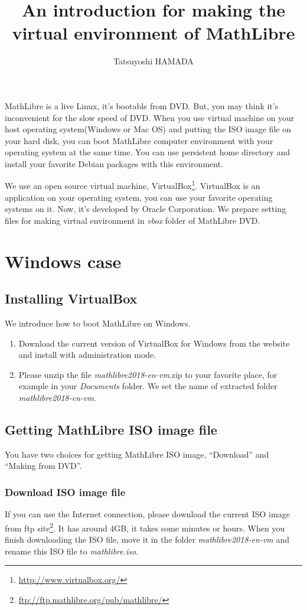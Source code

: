 \documentclass[a4]{article}
\title{An introduction for making the virtual environment of MathLibre}
\author{Tatsuyoshi HAMADA}
\newcommand{\vm}{{\em mathlibre2018-en-vm}}
\begin{document}
\maketitle
MathLibre is a live Linux, it's bootable from DVD.
But, you may think it's inconvenient for the slow speed of DVD.
When you use virtual machine on your host operating system(Windows or Mac OS) and
putting the ISO image file on your hard disk,
you can boot MathLibre computer environment with your operating system
at the same time.
You can use persistent home directory and install your favorite Debian
packages with this environment.

We use an open source virtual machine,
VirtualBox\footnote{\url{http://www.virtualbox.org/}}.
VirtualBox is an application on your operating system,
you can use your favorite operating systems on it.
Now, it's developed by Oracle Corporation.
We prepare setting files for making virtual environment 
in {\em vbox} folder of MathLibre DVD.

\section{Windows case}
\subsection{Installing VirtualBox}
We introduce how to boot MathLibre on Windows.
\begin{enumerate}
 \item Download the current version of VirtualBox for Windows from the
       website and install with administration mode.
 \item Please unzip the file \vm.zip{} to your favorite place, for example
       in your {\em Documents} folder. We set the name of extracted folder \vm{}.
\end{enumerate}

\subsection{Getting MathLibre ISO image file}
You have two choices for getting MathLibre ISO image,
``Download'' and ``Making from DVD''.

\subsubsection{Download ISO image file}
If you can use the Internet connection,
please download the current ISO image from ftp site\footnote{\url{ftp://ftp.mathlibre.org/pub/mathlibre/}}.
It has around 4GB, it takes some minutes or hours.
When you finish downloading the ISO file,
move it in the folder \vm{} and rename this ISO file to
{\em mathlibre.iso}. 
\end{document}
